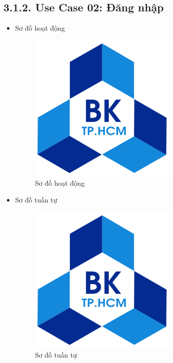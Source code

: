 \subsection*{3.1.2. Use Case 02: Đăng nhập}
\begin{itemize}
    \item Sơ đồ hoạt động
    \begin{figure}[H]
    \centering
    \includegraphics[scale=0.5 ]{Picture/hcmut.png}
    \caption{Sơ đồ hoạt động }
    \end{figure}
    \item Sơ đồ tuần tự
    \begin{figure}[H]
    \centering
    \includegraphics[scale=0.5 ]{Picture/hcmut.png}
    \caption{Sơ đồ tuần tự }
    \end{figure}
\end{itemize}
